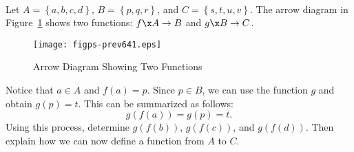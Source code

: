 \begin{previewactivity} \label{PA:compositionintro} \hfill \\
Let  $A = \left\{ {a, b, c, d} \right\}$, $B = \left\{ {p, q, r} \right\}$, and  
$C = \left\{ {s, t, u, v} \right\}$.  The arrow diagram in Figure~\ref{fig:preview64} shows two functions:  
$f\x A \to B$  and  $g\x B \to C$.

\begin{figure}[h]
\begin{center}
\texttt{[image: figps-prev641.eps]} 
\caption{Arrow Diagram Showing Two Functions} \label{fig:preview64}
\end{center}
\end{figure}
Notice that $a \in A$ and $ f(a) = p$.  Since $p \in B$, we can use the function $g$ and obtain 
$g(p) = t$.  This can be summarized as follows:
\[
g ( f(a) ) = g(p) = t.
\]
Using this process, determine $g ( f(b) )$, $g ( f(c) )$, and 
$g ( f(d) )$.  Then explain how we can now define a function from $A$ to $C$.

\end{previewactivity}
\hbreak
%
